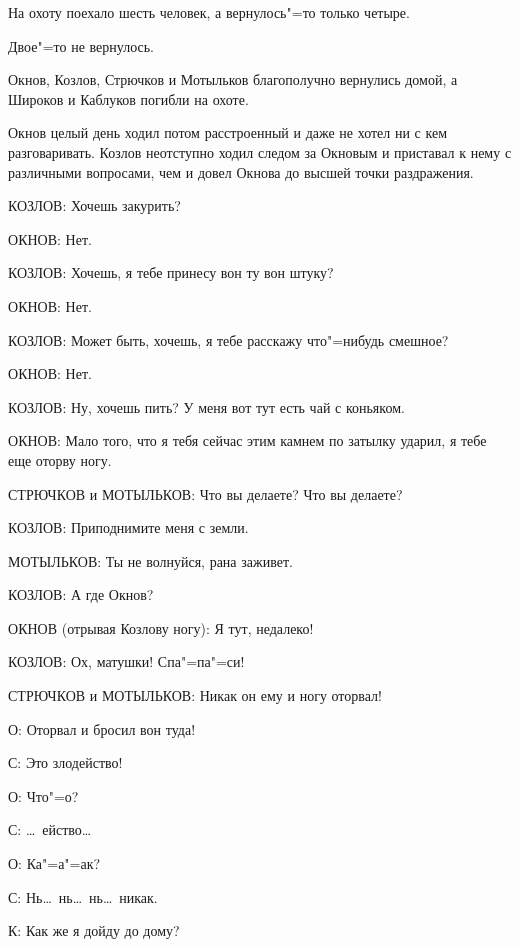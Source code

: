 На охоту поехало шесть человек, а вернулось"=то только четыре.

Двое"=то не вернулось.

Окнов, Козлов, Стрючков и Мотыльков благополучно вернулись домой, а Широков и Каблуков погибли на охоте.

Окнов целый день ходил потом расстроенный и даже не хотел ни с кем разговаривать. Козлов неотступно ходил следом за Окновым и приставал к нему с различными вопросами, чем и довел Окнова до высшей точки раздражения.

К{\footnotesize ОЗЛОВ}: Хочешь закурить?

О{\footnotesize КНОВ}: Нет.

К{\footnotesize ОЗЛОВ}: Хочешь, я тебе принесу вон ту вон штуку?

О{\footnotesize КНОВ}: Нет.

К{\footnotesize ОЗЛОВ}: Может быть, хочешь, я тебе расскажу что"=нибудь смешное?

О{\footnotesize КНОВ}: Нет.

К{\footnotesize ОЗЛОВ}: Ну, хочешь пить? У меня вот тут есть чай с коньяком.

О{\footnotesize КНОВ}: Мало того, что я тебя сейчас этим камнем по затылку ударил, я тебе еще оторву ногу.

С{\footnotesize ТРЮЧКОВ} и М{\footnotesize ОТЫЛЬКОВ}: Что вы делаете? Что вы делаете?

К{\footnotesize ОЗЛОВ}: Приподнимите меня с земли.

М{\footnotesize ОТЫЛЬКОВ}: Ты не волнуйся, рана заживет.

К{\footnotesize ОЗЛОВ}: А где Окнов?

О{\footnotesize КНОВ} (отрывая Козлову ногу): Я тут, недалеко!

К{\footnotesize ОЗЛОВ}: Ох, матушки! Спа"=па"=си!

С{\footnotesize ТРЮЧКОВ} и М{\footnotesize ОТЫЛЬКОВ}: Никак он ему и ногу оторвал!

О{}: Оторвал и бросил вон туда!

С{}: Это злодейство!

О{}: Что"=о?

С{}: \dots~ейство\dots

О{}: Ка"=а"=ак?

С{}: Нь\dots~нь\dots~нь\dots~никак.

К{}: Как же я дойду до дому?

